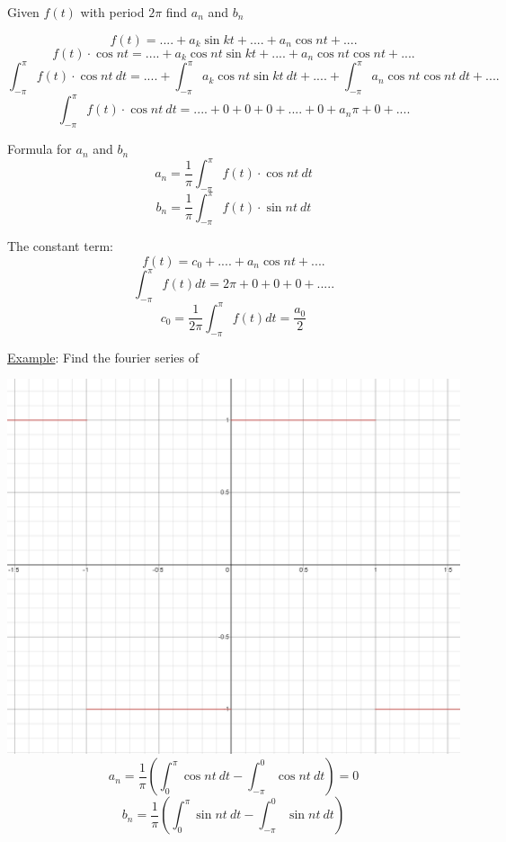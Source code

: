 \documentclass[12pt]{article}
\numberwithin{equation}{subsection}
\newcommand{\exa}{\noindent \underline{Example}: \hspace{1cm}}
\begin{document}
Given $f(t)$ with period $2\pi$ find $a_n$ and $b_n$

\begin{equation}
f(t) = ....+ a_k\sin kt + .... + a_n\cos nt+ ....
\end{equation}
\begin{equation}
f(t) \cdot \cos nt = ....+ a_k\cos nt \sin kt + .... + a_n\cos nt \cos nt+ ....
\end{equation}
\begin{equation}
\int_{-\pi}^{\pi} f(t) \cdot \cos nt\ dt= ....+\int_{-\pi}^{\pi} a_k\cos nt \sin kt\ dt + .... +\int_{-\pi}^{\pi} a_n\cos nt \cos nt\ dt+ ....
\end{equation}
\begin{equation}
\int_{-\pi}^{\pi} f(t) \cdot \cos nt\ dt=  ....+0+0+0+....+0+a_n \pi +0+ ....
\end{equation}

Formula for $a_n$ and $b_n$
\begin{equation}
a_n = \frac{1}{\pi} \int_{-\pi}^{\pi} f(t) \cdot \cos nt\ dt
\end{equation}
\begin{equation}
b_n = \frac{1}{\pi} \int_{-\pi}^{\pi} f(t) \cdot \sin nt\ dt
\end{equation}

The constant term:
\begin{equation}
f(t)=c_0 + ....+ a_n \cos nt + ....
\end{equation}
\begin{equation}
\int_{-\pi}^{\pi} f(t) dt = 2\pi + 0 + 0+ 0 +.....
\end{equation}
\begin{equation}
c_0 = \frac{1}{2\pi} \int_{-\pi}^{\pi} f(t) dt = \frac{a_0}{2}
\end{equation}

\exa Find the fourier series of

\includegraphics[scale=.175]{ExampleF} 
$$
a_n = \frac{1}{\pi} \left( \int_{0}^{\pi}\cos nt\ dt - \int_{-\pi}^{0} \cos nt\ dt\right) =0
$$
$$
b_n = \frac{1}{\pi} \left( \int_{0}^{\pi} \sin nt\ dt - \int_{-\pi}^{0} \sin nt\ dt\right) 
$$
\end{document}

